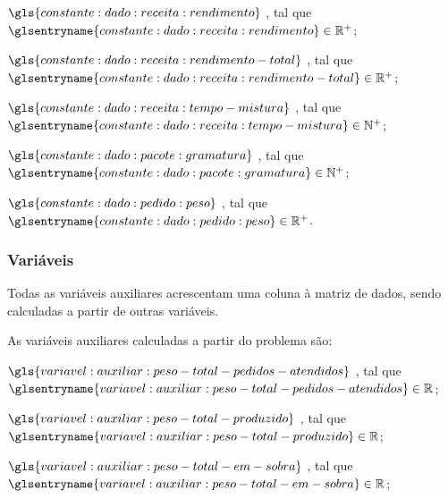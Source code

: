 
\begin{symbols}
    \item[\( \gls{constante:dado:receita:rendimento} \)]
    ,
    tal que \( \glsentryname{constante:dado:receita:rendimento} \in \mathbb{R}^{+} \);

    \item[\( \gls{constante:dado:receita:rendimento-total} \)]
    ,
    tal que \( \glsentryname{constante:dado:receita:rendimento-total} \in \mathbb{R}^{+} \);

    \item[\( \gls{constante:dado:receita:tempo-mistura} \)]
    ,
    tal que \( \glsentryname{constante:dado:receita:tempo-mistura} \in \mathbb{N}^{+} \);

    \item[\( \gls{constante:dado:pacote:gramatura} \)]
    ,
    tal que \( \glsentryname{constante:dado:pacote:gramatura} \in \mathbb{N}^{+} \);

    \item[\( \gls{constante:dado:pedido:peso} \)]
    ,
    tal que \( \glsentryname{constante:dado:pedido:peso} \in \mathbb{R}^{+} \).
\end{symbols}

\subsubsection{Variáveis}


Todas as variáveis auxiliares acrescentam uma coluna à matriz de dados, sendo calculadas a partir de outras variáveis.

As variáveis auxiliares calculadas a partir do problema são:

\begin{symbols}
    \item[\( \gls{variavel:auxiliar:peso-total-pedidos-atendidos} \)]
    ,
    tal que \( \glsentryname{variavel:auxiliar:peso-total-pedidos-atendidos} \in \mathbb{R} \);

    \item[\( \gls{variavel:auxiliar:peso-total-produzido} \)]
    ,
    tal que \( \glsentryname{variavel:auxiliar:peso-total-produzido} \in \mathbb{R} \);

    \item[\( \gls{variavel:auxiliar:peso-total-em-sobra} \)]
    ,
    tal que \( \glsentryname{variavel:auxiliar:peso-total-em-sobra} \in \mathbb{R} \);
\end{symbols}


